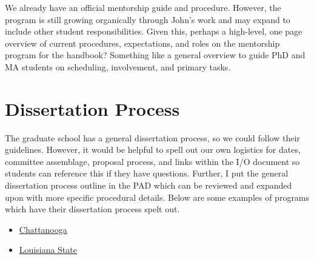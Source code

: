 \documentclass[
]{book}
\providecommand{\tightlist}{%
  \setlength{\itemsep}{0pt}\setlength{\parskip}{0pt}}
\begin{document}
We already have an official mentorship guide and procedure. However, the program is still growing organically through John's work and may expand to include other student responsibilities. Given this, perhaps a high-level, one page overview of current procedures, expectations, and roles on the mentorship program for the handbook? Something like a general overview to guide PhD and MA students on scheduling, involvement, and primary tasks.

\hypertarget{dissertation}{%
\chapter{Dissertation Process}\label{dissertation}}

The graduate school has a general dissertation process, so we could follow their guidelines. However, it would be helpful to spell out our own logistics for dates, committee assemblage, proposal process, and links within the I/O document so students can reference this if they have questions. Further, I put the general dissertation process outline in the PAD which can be reviewed and expanded upon with more specific procedural details. Below are some examples of programs which have their dissertation process spelt out.

\begin{itemize}
\tightlist
\item
  \href{https://www.utc.edu/doctorate-learning-leadership/doctoralguide/dissertationprocess/finaldefense.php}{Chattanooga}
\item
  \href{https://www.lsu.edu/hss/psychology/grad/io_graduate_handbook_2019-11-07.pdf}{Louisiana State}
\end{itemize}

  
\end{document}
